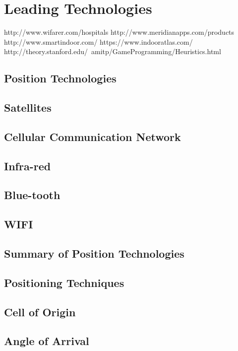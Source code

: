 \section{Leading Technologies}

http://www.wifarer.com/hospitals
http://www.meridianapps.com/products
http://www.smartindoor.com/
https://www.indooratlas.com/
http://theory.stanford.edu/~amitp/GameProgramming/Heuristics.html

\subsection{Position Technologies}

  \subsection{Satellites}

  \subsection{Cellular Communication Network}

  \subsection{Infra-red}

  \subsection{Blue-tooth}

  \subsection{WIFI}

  \subsection{Summary of Position Technologies}

\subsection{Positioning Techniques}

  \subsection{Cell of Origin}

  \subsection{Angle of Arrival}

